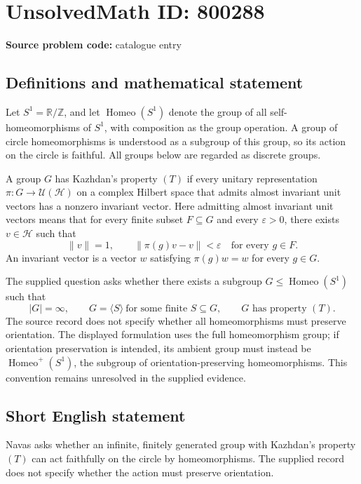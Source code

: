 \documentclass[11pt]{article}
\newcommand{\Z}{\mathbb{Z}}
\newcommand{\R}{\mathbb{R}}
\begin{document}
\section*{UnsolvedMath ID: 800288}
\textbf{Source problem code:} catalogue entry
\subsection{Definitions and mathematical statement}
Let \(S^1=\R/\Z\), and let \(\operatorname{Homeo}(S^1)\) denote the group of all self-homeomorphisms of \(S^1\), with composition as the group operation. A group of circle homeomorphisms is understood as a subgroup of this group, so its action on the circle is faithful. All groups below are regarded as discrete groups.

A group \(G\) has Kazhdan's property \((T)\) if every unitary representation \(\pi:G\to\mathcal U(\mathcal H)\) on a complex Hilbert space that admits almost invariant unit vectors has a nonzero invariant vector. Here admitting almost invariant unit vectors means that for every finite subset \(F\subseteq G\) and every \(\varepsilon>0\), there exists \(v\in\mathcal H\) such that
\[
\|v\|=1,\qquad \|\pi(g)v-v\|<\varepsilon\quad\text{for every }g\in F.
\]
An invariant vector is a vector \(w\) satisfying \(\pi(g)w=w\) for every \(g\in G\).

The supplied question asks whether there exists a subgroup \(G\leq\operatorname{Homeo}(S^1)\) such that
\[
|G|=\infty,\qquad G=\langle S\rangle\ \text{for some finite }S\subseteq G,\qquad G\text{ has property }(T).
\]
The source record does not specify whether all homeomorphisms must preserve orientation. The displayed formulation uses the full homeomorphism group; if orientation preservation is intended, its ambient group must instead be \(\operatorname{Homeo}^{+}(S^1)\), the subgroup of orientation-preserving homeomorphisms. This convention remains unresolved in the supplied evidence.
\subsection{Short English statement}
Navas asks whether an infinite, finitely generated group with Kazhdan's property \((T)\) can act faithfully on the circle by homeomorphisms. The supplied record does not specify whether the action must preserve orientation.
\end{document}
